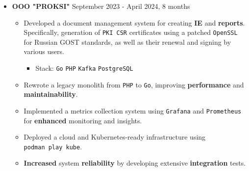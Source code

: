\begin{itemize}
\tightlist
\item
  \label{Ryabinkovux20Semyonux20Pavlovich-Workux20experience-OOOux20ux22PROKSIux22}{}\textbf{OOO
  "PROKSI"} \textbar{} September 2023 - April 2024, 8 months

  \begin{itemize}
  \tightlist
  \item
    Developed a document management system for creating
    \label{Ryabinkovux20Semyonux20Pavlovich-Workux20experience-IE}{}\textbf{IE}
    and
    \label{Ryabinkovux20Semyonux20Pavlovich-Workux20experience-reports}{}\textbf{reports}.
    Specifically, generation of \texttt{PKI\ CSR} certificates using a
    patched \texttt{OpenSSL} for Russian GOST standards, as well as
    their renewal and signing by various users.

    \begin{itemize}
    \tightlist
    \item
      Stack: \texttt{Go} \texttt{PHP} \texttt{Kafka} \texttt{PostgreSQL}
    \end{itemize}
  \item
    Rewrote a legacy monolith from \texttt{PHP} to \texttt{Go},
    improving
    \label{Ryabinkovux20Semyonux20Pavlovich-Workux20experience-performance}{}\textbf{performance}
    and
    \label{Ryabinkovux20Semyonux20Pavlovich-Workux20experience-maintainability}{}\textbf{maintainability}.
  \item
    Implemented a metrics collection system using \texttt{Grafana} and
    \texttt{Prometheus} for
    \label{Ryabinkovux20Semyonux20Pavlovich-Workux20experience-enhanced}{}\textbf{enhanced}
    monitoring and insights.
  \item
    Deployed a cloud and Kubernetes-ready infrastructure using
    \texttt{podman\ play\ kube}.
  \item
    \label{Ryabinkovux20Semyonux20Pavlovich-Workux20experience-Increased}{}\textbf{Increased}
    system
    \label{Ryabinkovux20Semyonux20Pavlovich-Workux20experience-reliability}{}\textbf{reliability}
    by developing extensive
    \label{Ryabinkovux20Semyonux20Pavlovich-Workux20experience-integration}{}\textbf{integration}
    tests.
  \end{itemize}
\end{itemize}

\label{Ryabinkovux20Semyonux20Pavlovich-Education}
